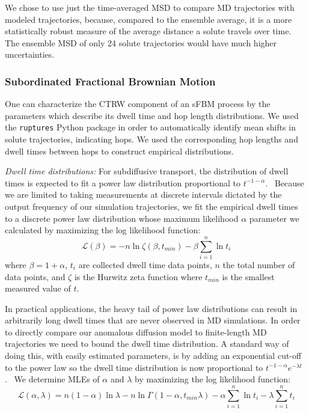 \documentclass[journal=jctcce,manuscript=article]{achemso}
\begin{document}
  We chose to use just the time-averaged MSD to compare MD trajectories with
  modeled trajectories, because, compared to the ensemble average, it is a more
  statistically robust measure of the average distance a solute travels over
  time. The ensemble MSD of only 24 solute trajectories would have much higher
  uncertainties.
  
  \subsubsection{Subordinated Fractional Brownian Motion}\label{method:sfbm}

  One can characterize the CTRW component of an sFBM process by the parameters
  which describe its dwell time and hop length distributions. We used the
  \texttt{ruptures} Python package in order to automatically identify mean
  shifts in solute trajectories, indicating hops.\cite{truong_ruptures:_2018}
  We used the corresponding hop lengths and dwell times between hops to
  construct empirical distributions.
  
  \textit{Dwell time distributions:} For subdiffusive transport, the distribution 
  of dwell times is expected to fit a power law distribution 
  proportional to $t^{-1-\alpha}$.~\cite{meroz_toolbox_2015}
  Because we are limited to taking measurements at discrete intervals dictated by the output 
  frequency of our simulation trajectories, we fit the empirical dwell times
  to a discrete power law distribution whose maximum likelihood $\alpha$ 
  parameter we calculated by maximizing the log likelihood function: 
  \begin{equation}
	\mathcal{L}(\beta) = -n\ln \zeta(\beta, t_{min}) -
	\beta\sum_{i=1}^{n} \ln t_i 
  \label{eqn:powerlaw_likelihood}
  \end{equation}
  where $\beta = 1 + \alpha$, $t_i$ are collected dwell time data points,
  $n$ the total number of data points, and $\zeta$ is the Hurwitz zeta function
  where $t_{min}$ is the smallest measured value of $t$.~\cite{clauset_power-law_2009}
  
  In practical applications, the heavy tail of power law distributions can result in 
  arbitrarily long dwell times that are never observed in MD simulations. 
  In order to directly compare our anomalous diffusion model to finite-length MD 
  trajectories we need to bound the dwell time distribution. A standard way of 
  doing this, with easily estimated parameters, is by adding an exponential 
  cut-off to the power law so the dwell time distribution is now proportional 
  to $t^{-1 - \alpha}e^{-\lambda t}$.~\cite{newman_power_2005,clauset_power-law_2009}  %
  We determine MLEs of $\alpha$ and $\lambda$ by maximizing the log 
  likelihood function:~\cite{clauset_power-law_2009}
  \begin{equation}
    \mathcal{L}(\alpha, \lambda) = n(1 - \alpha)\ln\lambda - n\ln\Gamma(1 - \alpha, t_{min}\lambda) - \alpha\sum_{i=1}^{n}\ln t_i - \lambda\sum_{i=1}^n t_i
  \label{eqn:powerlaw_cutoff_likelihood}
  \end{equation}
  
\end{document}
